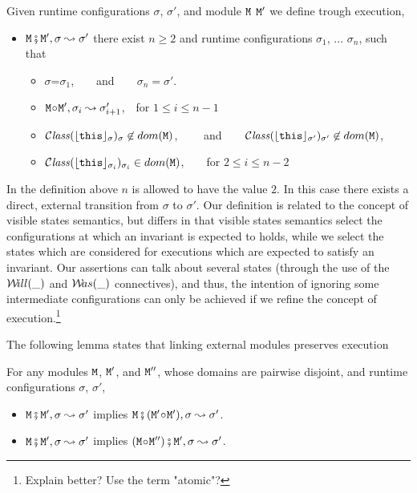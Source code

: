  
\begin{definition}
Given runtime configurations $\sigma$,  $\sigma'$,  and module $\M$ $\M'$ we define  
\label{def:module_pair_execution} trough execution,
\begin{itemize}
\item
$\M \mkpair \M', \sigma \leadsto \sigma'$ \IFF  
there exist  $n\geq 2$ and runtime configurations $\sigma_1$,  ...
$\sigma_n$, such that 
\begin{itemize}
\item
$\sigma$=$\sigma_1$,\ \  \ \ and\ \ \ \ $\sigma_n=\sigma'$.
\item
$\M \link \M', \sigma_i \leadsto \sigma_{i+1}'$,\  \  for $1\leq i \leq n\!-\!1$
\item
$\ClassOf{\interp {\this} {\sigma}} {\sigma}\not\in dom({\M})$,  \ \  \ \ and\ \ \ \ 
$\ClassOf{\interp {\this} {\sigma'}} {\sigma'} \not\in dom({\M})$,
\item
 $\ClassOf{\interp {\this} {\sigma_i}} {\sigma_i} \in dom({\M})$,\ \ \ \ for $2\leq i \leq n\!-\!2$
\end{itemize}
\end{itemize}

\end{definition}

In the definition above $n$ is allowed to have the value $2$. In this case there exists a direct, external transition from $\sigma$ to $\sigma'$.  Our definition is related to the concept of visible states semantics, but differs in that visible states semantics select the configurations at which an invariant is expected to holds, while we select the states which are considered for executions which are expected to satisfy an invariant. Our assertions can talk about several states (through the use of the $\Future {\_}$ and $\Past{\_}$ connectives), and thus, the intention of ignoring some intermediate configurations can only be achieved if we refine the concept of execution.\footnote{Explain better? Use the term "atomic"?}


The following lemma states that linking external modules preserves execution

\begin{lemma}
\label{lamma:module_pair_execution} 
For any modules $\M$, $\M'$, and $\M''$, whose domains are pairwise disjoint, and runtime configurations $\sigma$, $\sigma'$, 

\begin{itemize}
\item
 $\M \mkpair \M', \sigma \leadsto \sigma'$  implies $\M \mkpair (\M'\link\M') ,\sigma \leadsto \sigma'$.
\item
  $\M \mkpair \M', \sigma \leadsto \sigma'$  implies
$(\M\link\M'') \mkpair \M' , \sigma \leadsto \sigma'$.

\end{itemize}
\end{lemma} 

